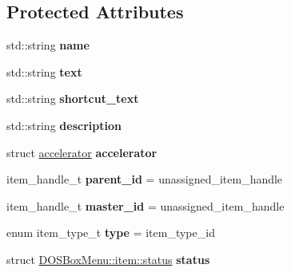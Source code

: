 \subsection*{Protected Attributes}
\begin{DoxyCompactItemize}
\item 
\hypertarget{classDOSBoxMenu_1_1item_a76c46a5f098c23eecaf5f8aa4957c7a2}{std\-::string {\bfseries name}}\label{classDOSBoxMenu_1_1item_a76c46a5f098c23eecaf5f8aa4957c7a2}

\item 
\hypertarget{classDOSBoxMenu_1_1item_a49c5f181a2bce2b9cecb80ca30f15753}{std\-::string {\bfseries text}}\label{classDOSBoxMenu_1_1item_a49c5f181a2bce2b9cecb80ca30f15753}

\item 
\hypertarget{classDOSBoxMenu_1_1item_a5d68f98bd5eb61e8d726f94b17c23f4a}{std\-::string {\bfseries shortcut\-\_\-text}}\label{classDOSBoxMenu_1_1item_a5d68f98bd5eb61e8d726f94b17c23f4a}

\item 
\hypertarget{classDOSBoxMenu_1_1item_acde7fca1de7577364be5fef182daa2cd}{std\-::string {\bfseries description}}\label{classDOSBoxMenu_1_1item_acde7fca1de7577364be5fef182daa2cd}

\item 
\hypertarget{classDOSBoxMenu_1_1item_a30530009bc347992555241596761f53a}{struct \hyperlink{structDOSBoxMenu_1_1accelerator}{accelerator} {\bfseries accelerator}}\label{classDOSBoxMenu_1_1item_a30530009bc347992555241596761f53a}

\item 
\hypertarget{classDOSBoxMenu_1_1item_afa5c8429fc1efd29d96d015dedf548ab}{item\-\_\-handle\-\_\-t {\bfseries parent\-\_\-id} = unassigned\-\_\-item\-\_\-handle}\label{classDOSBoxMenu_1_1item_afa5c8429fc1efd29d96d015dedf548ab}

\item 
\hypertarget{classDOSBoxMenu_1_1item_ad14a367fb9747ad1d9113ddb423aafdd}{item\-\_\-handle\-\_\-t {\bfseries master\-\_\-id} = unassigned\-\_\-item\-\_\-handle}\label{classDOSBoxMenu_1_1item_ad14a367fb9747ad1d9113ddb423aafdd}

\item 
\hypertarget{classDOSBoxMenu_1_1item_a51ae39e7c7c9c7948f52d05aa885ad01}{enum item\-\_\-type\-\_\-t {\bfseries type} = item\-\_\-type\-\_\-id}\label{classDOSBoxMenu_1_1item_a51ae39e7c7c9c7948f52d05aa885ad01}

\item 
\hypertarget{classDOSBoxMenu_1_1item_a248dad7740513a938438677c2e89d978}{struct \hyperlink{structDOSBoxMenu_1_1item_1_1status}{D\-O\-S\-Box\-Menu\-::item\-::status} {\bfseries status}}\label{classDOSBoxMenu_1_1item_a248dad7740513a938438677c2e89d978}


\end{DoxyCompactItemize}
